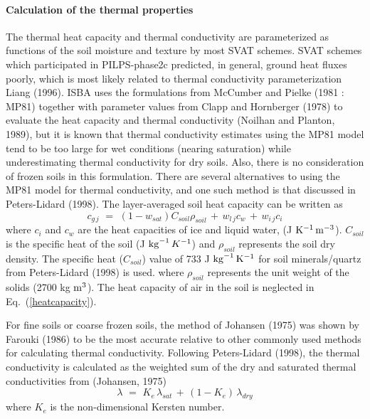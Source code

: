 \paragraph{Calculation of the thermal properties}
%
The thermal heat capacity and thermal conductivity
are parameterized as functions
of the soil moisture and texture by most SVAT schemes.
SVAT schemes which participated in
PILPS-phase2c predicted, in general, ground heat fluxes
poorly, which is most likely related to thermal 
conductivity parameterization Liang \etal (1996)\nocite{Liang1996}. 
ISBA uses the formulations from McCumber and Pielke (1981 : MP81)\nocite{McCumber1981}
together with parameter values from Clapp and Hornberger (1978)
to evaluate the heat capacity and thermal conductivity
(Noilhan and Planton, 1989), but
it is known that thermal conductivity estimates using the 
MP81 model tend to be too large for wet conditions (nearing saturation)
while underestimating thermal conductivity for dry soils.
Also, there is no consideration of frozen soils in this formulation.
There are several alternatives to using the MP81 
model for thermal conductivity, and
one such method is that discussed in Peters-Lidard \etal (1998)\nocite{Peters-Lidard1998}.
%
The layer-averaged soil heat capacity can be written as
%
\begin{equation}\label{heatcapacity}
c_{g\,j} \,\,=\,\, (1-w_{sat})C_{soil}\rho_{soil} 
\,+\, w_{l\,j} c_w \, +\, w_{i\,j} c_i 
\end{equation}
%
where 
$c_i$ and $c_w$ are the heat capacities of ice and liquid water, 
(J ${\rm K^{-1} \, m^{-3}}$).
$C_{soil}$ is the specific heat of the soil (J ${\rm {kg}^{-1}}
\, K^{-1}$) and $\rho_{soil}$ represents the soil dry density.
The specific heat ($C_{soil}$) value of 733 J ${\rm {kg}^{-1} \, K^{-1}}$
for soil minerals/quartz from
Peters-Lidard \etal (1998) is used.
%
%
where $\rho_{soil}$ represents the unit weight of the solids 
(2700 kg ${\rm m^3}$).
%
The heat capacity of air in the soil is neglected in
Eq.~(\ref{heatcapacity}).

For fine soils or coarse frozen soils, the method of Johansen (1975)\nocite{johansen1975} was 
shown by Farouki (1986)\nocite{farouki1986} to be the most accurate relative to other commonly
used methods for calculating thermal conductivity.
Following Peters-Lidard \etal (1998),
the thermal conductivity is calculated as the weighted sum of
the dry and saturated thermal conductivities from (Johansen, 1975)
%
\begin{equation}\label{condpl}
\lambda \,\,=\,\, K_e \,\lambda_{sat} \,+\,(1-K_e)\,\lambda_{dry}
\end{equation}
%
where $K_e$ is the non-dimensional Kersten number.

